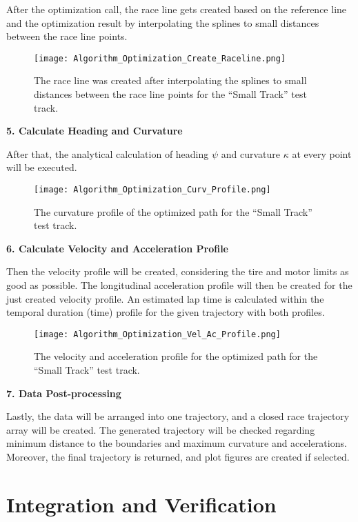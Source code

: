 After the optimization call, the race line gets created based on the reference line and the optimization result by interpolating the splines to small distances between the race line points.
\begin{figure}[H]
    \centering
    \texttt{[image: Algorithm\_Optimization\_Create\_Raceline.png]}
    \caption{The race line was created after interpolating the splines to small distances between the race line points for the ``Small Track'' test track.}
    \label{fig:Optimization Algorithm Created Race Line}
\end{figure}

\textbf{5. Calculate Heading and Curvature}

After that, the analytical calculation of heading $\psi$ and curvature $\kappa$ at every point will be executed.
\begin{figure}[H]
    \centering
    \texttt{[image: Algorithm\_Optimization\_Curv\_Profile.png]}
    \caption{The curvature profile of the optimized path for the ``Small Track'' test track.}
    \label{fig:Optimization Algorithm Curvature Profile}
\end{figure}

\textbf{6. Calculate Velocity and Acceleration Profile}

Then the velocity profile will be created, considering the tire and motor limits as good as possible. The longitudinal acceleration profile will then be created for the just created velocity profile. An estimated lap time is calculated within the temporal duration (time) profile for the given trajectory with both profiles.
\begin{figure}[H]
    \centering
    \texttt{[image: Algorithm\_Optimization\_Vel\_Ac\_Profile.png]}
    \caption{The velocity and acceleration profile for the optimized path for the ``Small Track'' test track.}
    \label{fig:Optimization Algorithm Velocity and Acceleration Profile}
\end{figure}

\textbf{7. Data Post-processing}

Lastly, the data will be arranged into one trajectory, and a closed race trajectory array will be created. The generated trajectory will be checked regarding minimum distance to the boundaries and maximum curvature and accelerations. Moreover, the final trajectory is returned, and plot figures are created if selected.

\section{Integration and Verification} \label{sec:Integration and Verification}

